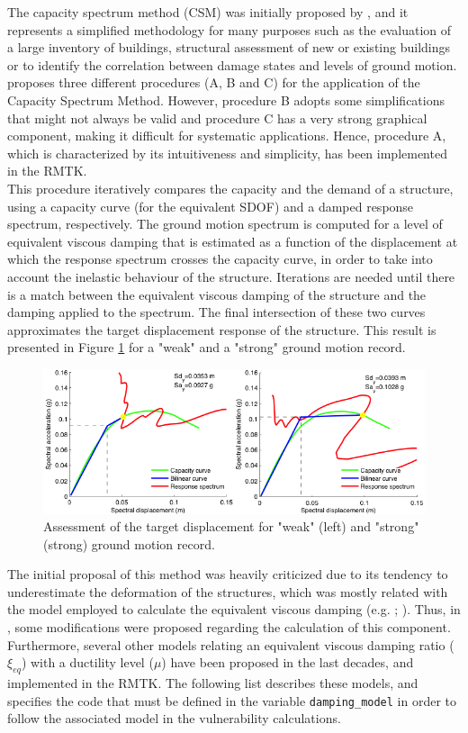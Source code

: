 The capacity spectrum method (CSM) was initially proposed by \citep{FreemanEtAl1975}, and it represents a simplified methodology for many purposes such as the evaluation of a large inventory of buildings, structural assessment of new or existing buildings or to identify the correlation between damage states and levels of ground motion. \cite{ATC1996} proposes three different procedures (A, B and C) for the application of the Capacity Spectrum Method. However, procedure B adopts some simplifications that might not always be valid and procedure C has a very strong graphical component, making it difficult for systematic applications. Hence, procedure A, which is characterized by its intuitiveness and simplicity, has been implemented in the RMTK.\\

This procedure iteratively compares the capacity and the demand of a structure, using a capacity curve (for the equivalent SDOF) and a damped response spectrum, respectively. The ground motion spectrum is computed for a level of equivalent viscous damping that is estimated as a function of the displacement at which the response spectrum crosses the capacity curve, in order to take into account the inelastic behaviour of the structure. Iterations are needed until there is a match between the equivalent viscous damping of the structure and the damping applied to the spectrum. The final intersection of these two curves approximates the target displacement response of the structure. This result is presented in Figure \ref{fig:per_point} for a "weak" and a "strong" ground motion record. \\

\begin{figure}[htb]
  \centering
      \includegraphics[width=12cm]{Figures/performance_points.png}
  \caption{Assessment of the target displacement for "weak" (left) and "strong" (strong) ground motion record.}
  \label{fig:per_point}
\end{figure}
The initial proposal of this method was heavily criticized due to its tendency to underestimate the deformation of the structures, which was mostly related with the model employed to calculate the equivalent viscous damping (e.g. \cite{Fajfar1999}; \cite{ChopraGoel2010}). Thus, in \cite{FEMA4402005}, some modifications were proposed regarding the calculation of this component. Furthermore, several other models relating an equivalent viscous damping ratio ($\xi_{eq}$) with a ductility level ($\mu$) have been proposed in the last decades, and implemented in the RMTK. The following list describes these models, and specifies the code that must be defined in the variable \verb=damping_model= in order to follow the associated model in the vulnerability calculations.\\

